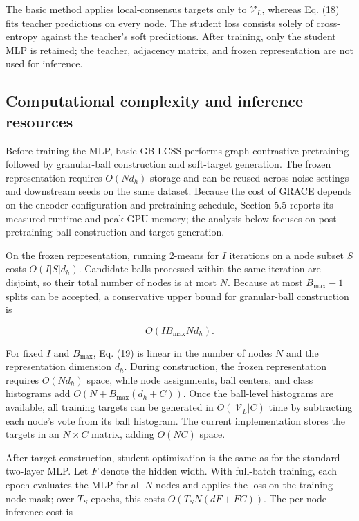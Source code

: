 \documentclass[10pt,letterpaper]{elsarticle}
\begin{document}
The basic method applies local-consensus targets only to \(\mathcal{V}_{L}\), whereas Eq. (18) fits teacher predictions on every node. The student loss consists solely of cross-entropy against the teacher's soft predictions. After training, only the student MLP is retained; the teacher, adjacency matrix, and frozen representation are not used for inference.

\subsection{Computational complexity and inference resources}\label{sec:3.6}

Before training the MLP, basic GB-LCSS performs graph contrastive pretraining followed by granular-ball construction and soft-target generation. The frozen representation requires \(O(Nd_{h})\) storage and can be reused across noise settings and downstream seeds on the same dataset. Because the cost of GRACE depends on the encoder configuration and pretraining schedule, Section 5.5 reports its measured runtime and peak GPU memory; the analysis below focuses on post-pretraining ball construction and target generation.

On the frozen representation, running 2-means for \(I\) iterations on a node subset \(S\) costs \(O(I|S|d_{h})\). Candidate balls processed within the same iteration are disjoint, so their total number of nodes is at most \(N\). Because at most \(B_{\max} - 1\) splits can be accepted, a conservative upper bound for granular-ball construction is

\begin{equation}\label{eq:19}
O(IB_{\max}Nd_{h}).
\end{equation}

For fixed \(I\) and \(B_{\max}\), Eq. (19) is linear in the number of nodes \(N\) and the representation dimension \(d_{h}\). During construction, the frozen representation requires \(O(Nd_{h})\) space, while node assignments, ball centers, and class histograms add \(O(N + B_{\max}(d_{h} + C))\). Once the ball-level histograms are available, all training targets can be generated in \(O(|\mathcal{V}_{L}|C)\) time by subtracting each node's vote from its ball histogram. The current implementation stores the targets in an \(N \times C\) matrix, adding \(O(NC)\) space.

After target construction, student optimization is the same as for the standard two-layer MLP. Let \(F\) denote the hidden width. With full-batch training, each epoch evaluates the MLP for all \(N\) nodes and applies the loss on the training-node mask; over \(T_{S}\) epochs, this costs \(O(T_{S}N(dF + FC))\). The per-node inference cost is
\end{document}

